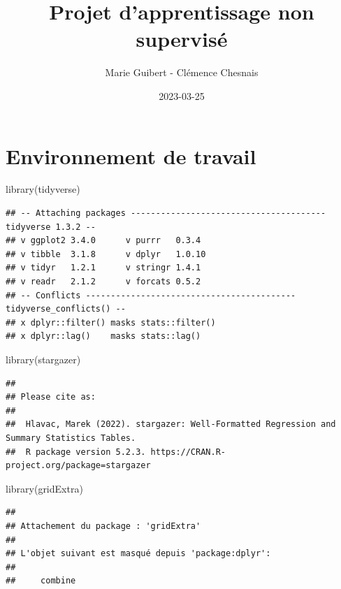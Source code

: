 \documentclass[
]{article}
\title{Projet d'apprentissage non supervisé}
\author{Marie Guibert - Clémence Chesnais}
\date{2023-03-25}
\newenvironment{Shaded}{\begin{snugshade}}{\end{snugshade}}
\newcommand{\FunctionTok}[1]{\textcolor[rgb]{0.00,0.00,0.00}{#1}}
\newcommand{\NormalTok}[1]{#1}
\begin{document}
\maketitle

\hypertarget{environnement-de-travail}{%
\section{Environnement de travail}\label{environnement-de-travail}}

\begin{Shaded}
\begin{Highlighting}[]
\FunctionTok{library}\NormalTok{(tidyverse)}
\end{Highlighting}
\end{Shaded}

\begin{verbatim}
## -- Attaching packages --------------------------------------- tidyverse 1.3.2 --
## v ggplot2 3.4.0      v purrr   0.3.4 
## v tibble  3.1.8      v dplyr   1.0.10
## v tidyr   1.2.1      v stringr 1.4.1 
## v readr   2.1.2      v forcats 0.5.2 
## -- Conflicts ------------------------------------------ tidyverse_conflicts() --
## x dplyr::filter() masks stats::filter()
## x dplyr::lag()    masks stats::lag()
\end{verbatim}

\begin{Shaded}
\begin{Highlighting}[]
\FunctionTok{library}\NormalTok{(stargazer)}
\end{Highlighting}
\end{Shaded}

\begin{verbatim}
## 
## Please cite as: 
## 
##  Hlavac, Marek (2022). stargazer: Well-Formatted Regression and Summary Statistics Tables.
##  R package version 5.2.3. https://CRAN.R-project.org/package=stargazer
\end{verbatim}

\begin{Shaded}
\begin{Highlighting}[]
\FunctionTok{library}\NormalTok{(gridExtra)}
\end{Highlighting}
\end{Shaded}

\begin{verbatim}
## 
## Attachement du package : 'gridExtra'
## 
## L'objet suivant est masqué depuis 'package:dplyr':
## 
##     combine
\end{verbatim}
\end{document}

